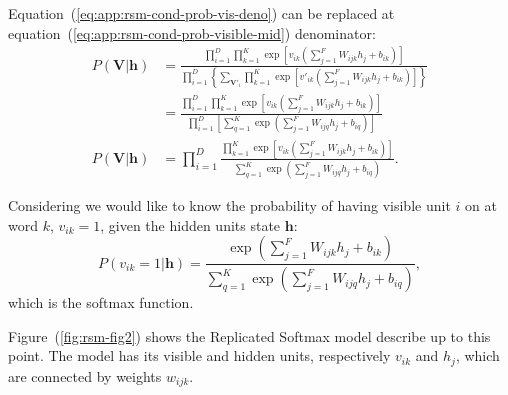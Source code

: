 Equation~(\ref{eq:app:rsm-cond-prob-vis-deno}) can be replaced at equation~(\ref{eq:app:rsm-cond-prob-visible-mid}) denominator:
\begin{align}
    P(\mathbf{V} | \mathbf{h}) &= \frac{\prod\limits^{D}_{i=1} \prod\limits^{K}_{k=1} \exp{\left[ v_{ik} \left( \sum\limits^{F}_{j=1} W_{ijk} h_{j} + b_{ik}\right)\right]}}{\prod\limits^{D}_{i=1} \left\{\sum\limits_{\mathbf{V}'_{i}} \prod\limits^{K}_{k=1} \exp{\left[ v'_{ik} \left( \sum\limits^{F}_{j=1} W_{ijk} h_{j} + b_{ik}\right)\right]}\right\}} \nonumber \\ %
    &= \frac{\prod\limits^{D}_{i=1} \prod\limits^{K}_{k=1} \exp{\left[ v_{ik} \left( \sum\limits^{F}_{j=1} W_{ijk} h_{j} + b_{ik}\right)\right]}}{\prod\limits^{D}_{i=1} \left[ \sum\limits^{K}_{q=1} \exp{\left( \sum\limits^{F}_{j=1} W_{ijq} h_{j} + b_{iq}\right)} \right]} \nonumber \\ %
    P(\mathbf{V} | \mathbf{h}) &= \prod\limits^{D}_{i=1} \frac{\prod\limits^{K}_{k=1} \exp{\left[ v_{ik} \left( \sum\limits^{F}_{j=1} W_{ijk} h_{j} + b_{ik}\right)\right]}}{\sum\limits^{K}_{q=1} \exp{\left( \sum\limits^{F}_{j=1} W_{ijq} h_{j} + b_{iq}\right)}}.
\end{align}

Considering we would like to know the probability of having visible unit $i$ on at word $k$, $v_{ik} = 1$, given the hidden units state $\mathbf{h}$:
\begin{equation}
    \label{eq:app:rsm-visible-softmax}
    P(v_{ik} = 1 | \mathbf{h}) = \frac{\exp{\left( \sum\limits^{F}_{j=1} W_{ijk} h_{j} + b_{ik}\right)}}{\sum\limits^{K}_{q=1} \exp{\left( \sum\limits^{F}_{j=1} W_{ijq} h_{j} + b_{iq}\right)}},
\end{equation}
which is the softmax function.

Figure~(\ref{fig:rsm-fig2}) shows the Replicated Softmax model describe up to this point. The model has its visible and hidden units, respectively $v_{ik}$ and $h_{j}$, which are connected by weights $w_{ijk}$. 

